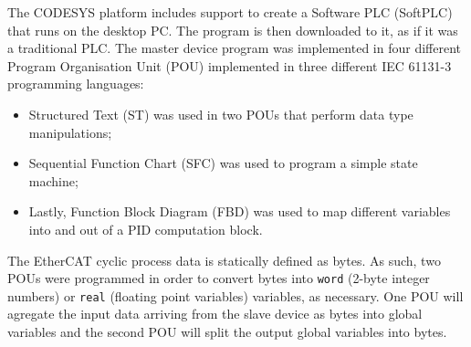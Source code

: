 The CODESYS platform includes support to create a Software PLC (SoftPLC) that runs on the desktop PC.
The program is then downloaded to it, as if it was a traditional PLC.
The master device program was implemented in four different Program Organisation Unit (POU) implemented in three different IEC 61131-3 programming languages: 
\begin{itemize}
	\item Structured Text (ST) was used in two POUs that perform data type manipulations;
	\item Sequential Function Chart (SFC) was used to program a simple state machine;
	\item Lastly, Function Block Diagram (FBD) was used to map different variables into and out of a PID computation block.
\end{itemize}

The EtherCAT cyclic process data is statically defined as bytes.
As such, two POUs were programmed in order to convert bytes into \verb|word| (2-byte integer numbers) or \verb|real| (floating point variables) variables, as necessary.
One POU will agregate the input data arriving from the slave device as bytes into global variables and the second POU will split the output global variables into bytes.
